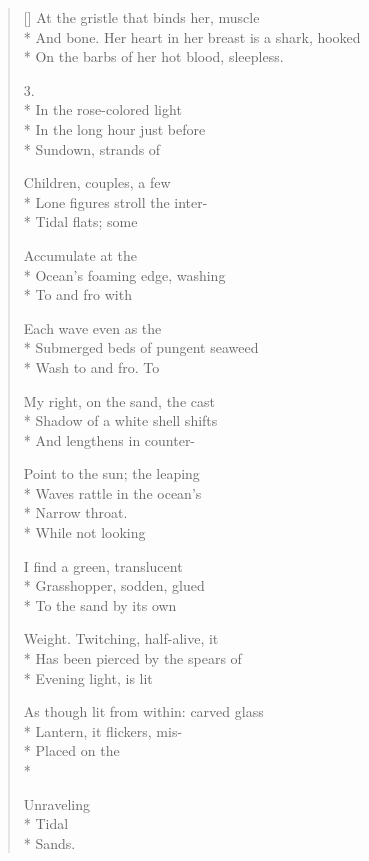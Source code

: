 \begin{verse}[\versewidth]
At the gristle that binds her, muscle\\*
And bone.   Her heart in her breast is a shark, hooked\\*
On the barbs of her hot blood, sleepless.

3.\\*
In the rose-colored light\\*
In the long hour just before \\*
Sundown, strands of

Children, couples, a few\\*
Lone figures stroll the inter-\\*
Tidal flats; some

Accumulate at the \\*
Ocean's foaming edge, washing\\*
To and fro with

Each wave    even   as the\\*
Submerged beds of pungent seaweed\\*
Wash to and fro.     To

My right, on the sand, the cast\\*
Shadow of a white shell shifts\\*
And lengthens in counter-

Point to the sun; the leaping\\*
Waves rattle in the ocean's\\*
Narrow throat.\\*
\hspace{3\vgap} While not looking

I find a green, translucent\\*
Grasshopper, sodden, glued\\*
To the sand by its own 

Weight. Twitching, half-alive, it\\*
Has been pierced by the spears of\\*
Evening light, is lit

As though lit from within: carved glass\\*
Lantern, it flickers, mis-\\*
Placed on the\\*

\hspace{2\vgap} Unraveling\\*
Tidal\\*
\hspace{1\vgap} Sands.
\end{verse}
